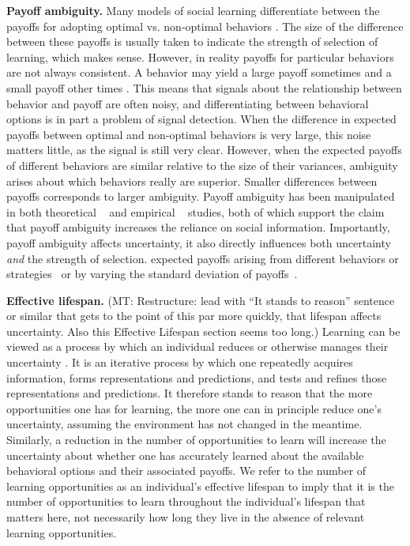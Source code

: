 \documentclass[letterpaper,11.5pt]{scrartcl}
\newcommand{\mt}[1]{{\textcolor{myorange} {({\tiny MT:} #1)}}}
\begin{document}
\textbf{Payoff ambiguity.} Many models of social learning differentiate between
the payoffs for adopting optimal vs. non-optimal behaviors
\cite{Rogers1988,Enquist2007,Rendell2010}. The size of the difference between
these payoffs is usually taken to indicate the strength of selection of learning,
which makes sense. However, in reality payoffs for particular behaviors are not
always consistent. A behavior may yield a large payoff sometimes and a small
payoff other times \cite{McElreath2005}. This means that signals about the
relationship between behavior and payoff are often noisy, and differentiating
between behavioral options is in part a problem of signal detection.  When the
difference in expected payoffs between optimal and non-optimal behaviors is very
large, this noise matters little, as the signal is still very clear. However, when
the expected payoffs of different behaviors are similar relative to the size of
their variances, ambiguity arises about which behaviors really are superior.
Smaller differences between payoffs corresponds to larger ambiguity. Payoff
ambiguity has been manipulated in both theoretical ~\cite{perreault2012bayesian}
and empirical ~\cite{McElreath2005, Morgan2012} studies, both of which support the
claim that payoff ambiguity increases the reliance on social information.
Importantly, payoff ambiguity %
affects uncertainty, it also directly influences both uncertainty \emph{and} the
strength of selection. %
expected payoffs arising from different behaviors or
strategies~\cite{Enquist2007,Rendell2010} or by varying the standard deviation of
payoffs~\cite{McElreath2005}. 

\textbf{Effective lifespan.} \mt{Restructure: lead with ``It stands to reason''
sentence or similar that gets to the point of this par more quickly, that lifespan
affects uncertainty. Also this Effective Lifespan section seems too long.}
Learning can be viewed as a process by which an individual reduces or otherwise
manages their uncertainty \cite{jacobs2011bayesian,clark2013whatever}. It is an
iterative process by which one repeatedly acquires information, forms
representations and predictions, and tests and refines those representations and
predictions. It therefore stands to reason that the more opportunities one has for
learning, the more one can in principle reduce one's uncertainty, assuming the
environment has not changed in the meantime. Similarly, a reduction in the number
of opportunities to learn will increase the uncertainty about whether one has
accurately learned about the available behavioral options and their associated
payoffs. We refer to the number of learning opportunities as an individual's
effective lifespan to imply that it is the number of opportunities to learn
throughout the individual's lifespan that matters here, not necessarily how long
they live in the absence of relevant learning opportunities.  
\end{document}
